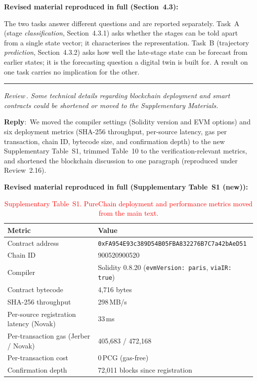 \documentclass[11pt]{article}
\newcounter{reviewer}
\newcounter{point}[reviewer]
\renewcommand{\thepoint}{Review\,\thereviewer.\arabic{point}}
\newcommand{\point}[1]{\refstepcounter{point}  \bigskip \hrule \medskip \noindent \textit{{\fontseries{b}\selectfont \thepoint } #1}\par}
\newcommand{\reply}{\medskip \noindent \textbf{Reply}:\ }
\newcommand{\revisedheading}[1]{\medskip\noindent\textbf{Revised material
  reproduced in full (#1):}\par}
\newenvironment{revised}{\par\color{red}}{\par}
\begin{document}
\revisedheading{Section~4.3}
\begin{revised}
The two tasks answer different questions and are reported separately. Task~A (stage \textit{classification}, Section~4.3.1) asks whether the stages can be told apart from a single state vector; it characterises the representation. Task~B (trajectory \textit{prediction}, Section~4.3.2) asks how well the late-stage state can be forecast from earlier states; it is the forecasting question a digital twin is built for. A result on one task carries no implication for the other.
\end{revised}

\point{ Some technical details regarding blockchain deployment and smart contracts could be shortened or moved to the Supplementary Materials.}

\reply{We moved the compiler settings (Solidity version and EVM options) and six deployment metrics (SHA-256 throughput, per-source latency, gas per transaction, chain ID, bytecode size, and confirmation depth) to the new Supplementary Table~S1, trimmed Table~10 to the verification-relevant metrics, and shortened the blockchain discussion to one paragraph (reproduced under Review~2.16).}

\revisedheading{Supplementary Table~S1 (new)}
\begin{table}[!htbp]
\centering
\caption{\textcolor{red}{Supplementary Table~S1. PureChain deployment and performance metrics moved from the main text.}}
\color{red}
\begin{tabular}{ll}
\toprule
Metric & Value \\
\midrule
Contract address & \texttt{0xFA954E93c389D54B05FBA832276B7C7a42bAeD51} \\
Chain ID & 900520900520 \\
Compiler & Solidity 0.8.20 (\texttt{evmVersion: paris}, \texttt{viaIR: true}) \\
Contract bytecode & 4,716 bytes \\
SHA-256 throughput & 298\,MB/s \\
Per-source registration latency (Novak) & 33\,ms \\
Per-transaction gas (Jerber / Novak) & 405,683 / 472,168 \\
Per-transaction cost & 0\,PCG (gas-free) \\
Confirmation depth & 72,011 blocks since registration \\
\bottomrule
\end{tabular}
\end{table}
\end{document}
